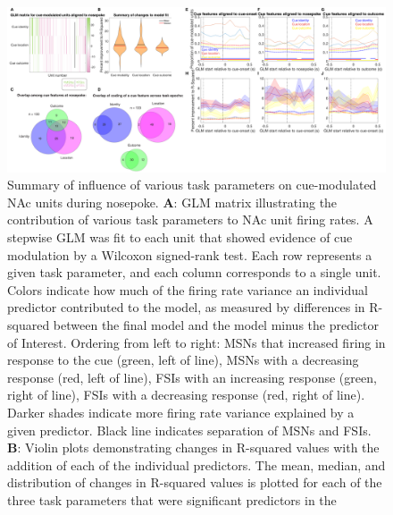 \documentclass[11pt]{article}
\newcommand{\bsf}[1]{\textbf{#1}}
\begin{document}
 \begin{figure}[ht!]
\centering
\includegraphics[width=\textwidth]{Fig 9 - NP GLM.pdf}
\caption{Summary of influence of various task parameters on cue-modulated NAc
units during nosepoke. \bsf{A}: GLM matrix illustrating the contribution of various
task parameters to NAc unit firing rates. A stepwise GLM was fit to each unit that
showed evidence of cue modulation by a Wilcoxon signed-rank test. Each row
represents a given task parameter, and each column corresponds to a single unit. Colors indicate how much of the firing rate variance an
individual predictor contributed to the model, as measured by differences in
R-squared between the final model and the model minus the predictor of
Interest. Ordering from left to right: MSNs that increased firing
in response to the cue (green, left of line), MSNs with a decreasing response
(red, left of line), FSIs with an increasing response (green, right of line),
FSIs with a decreasing response (red, right of line). Darker shades indicate
more firing rate variance explained by a given predictor. Black line indicates
separation of MSNs and FSIs. \bsf{B}: Violin plots demonstrating changes in
R-squared values with the addition of each of the individual predictors. The
mean, median, and distribution of changes in R-squared values is plotted for
each of the three task parameters that were significant predictors in the
}
\end{figure}
\end{document}
